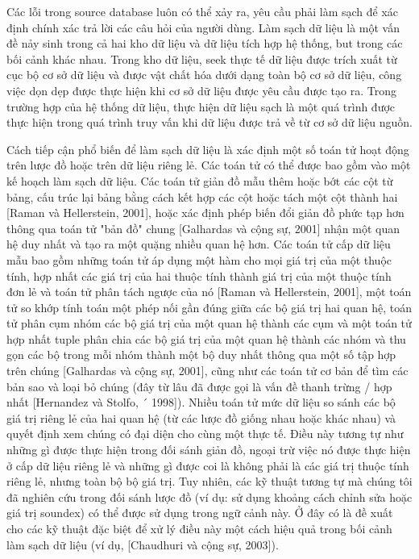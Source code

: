 \documentclass[a4paper]{article}
\begin{document}
Các lỗi trong source database luôn có thể xảy ra, yêu cầu phải làm sạch để xác định chính xác
trả lời các câu hỏi của người dùng. Làm sạch dữ liệu là một vấn đề nảy sinh trong cả hai kho dữ liệu
và dữ liệu tích hợp hệ thống, but trong các bối cảnh khác nhau. Trong kho dữ liệu, seek
thực tế dữ liệu được trích xuất từ cục bộ cơ sở dữ liệu và được vật chất hóa dưới dạng
toàn bộ cơ sở dữ liệu, công việc dọn dẹp được thực hiện khi cơ sở dữ liệu được yêu cầu được tạo ra. Trong trường hợp của hệ thống dữ liệu, thực hiện dữ liệu sạch là một quá trình được thực hiện trong quá trình truy vấn khi dữ liệu được trả về từ cơ sở dữ liệu nguồn.


Cách tiếp cận phổ biến để làm sạch dữ liệu là xác định một số toán tử
hoạt động trên lược đồ hoặc trên dữ liệu riêng lẻ. Các toán tử có thể được bao gồm
vào một kế hoạch làm sạch dữ liệu. Các toán tử giản đồ mẫu thêm hoặc bớt các cột từ bảng,
cấu trúc lại bảng bằng cách kết hợp các cột hoặc tách một cột thành hai [Raman
và Hellerstein, 2001], hoặc xác định phép biến đổi giản đồ phức tạp hơn thông qua
toán tử "bản đồ" chung [Galhardas và cộng sự, 2001] nhận một quan hệ duy nhất và
tạo ra một quặng nhiều quan hệ hơn. Các toán tử cấp dữ liệu mẫu bao gồm những toán tử
áp dụng một hàm cho mọi giá trị của một thuộc tính, hợp nhất các giá trị của hai thuộc tính thành
giá trị của một thuộc tính đơn lẻ và toán tử phân tách ngược của nó [Raman và Hellerstein,
2001], một toán tử so khớp tính toán một phép nối gần đúng giữa các bộ giá trị
hai quan hệ, toán tử phân cụm nhóm các bộ giá trị của một quan hệ thành các cụm và một
toán tử hợp nhất tuple phân chia các bộ giá trị của một quan hệ thành các nhóm và thu gọn
các bộ trong mỗi nhóm thành một bộ duy nhất thông qua một số tập hợp trên chúng
[Galhardas và cộng sự, 2001], cũng như các toán tử cơ bản để tìm các bản sao và loại bỏ
chúng (đây từ lâu đã được gọi là vấn đề thanh trừng / hợp nhất [Hernandez và Stolfo, ´
1998]). Nhiều toán tử mức dữ liệu so sánh các bộ giá trị riêng lẻ của hai quan hệ
(từ các lược đồ giống nhau hoặc khác nhau) và quyết định xem chúng có đại diện cho
cùng một thực tế. Điều này tương tự như những gì được thực hiện trong đối sánh giản đồ, ngoại trừ việc nó được thực hiện
ở cấp dữ liệu riêng lẻ và những gì được coi là không phải là các giá trị thuộc tính riêng lẻ,
nhưng toàn bộ bộ giá trị. Tuy nhiên, các kỹ thuật tương tự mà chúng tôi đã nghiên cứu trong đối sánh lược đồ
(ví dụ: sử dụng khoảng cách chỉnh sửa hoặc giá trị soundex) có thể được sử dụng trong ngữ cảnh này. Ở đây có
là đề xuất cho các kỹ thuật đặc biệt để xử lý điều này một cách hiệu quả trong bối cảnh
làm sạch dữ liệu (ví dụ, [Chaudhuri và cộng sự, 2003]).
\end{document}
